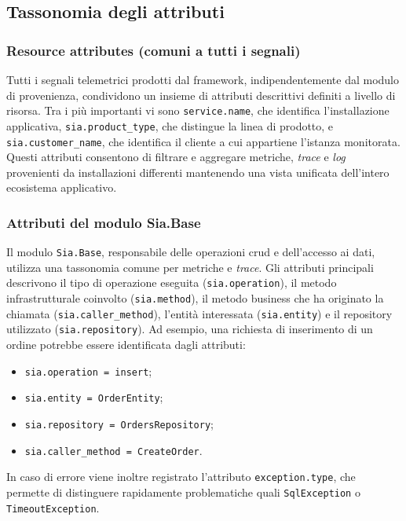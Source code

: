 \subsection{Tassonomia degli attributi}

\subsubsection{Resource attributes (comuni a tutti i segnali)}

Tutti i segnali telemetrici prodotti dal framework, indipendentemente dal modulo di provenienza, condividono un insieme di attributi descrittivi definiti a livello di risorsa. Tra i più importanti vi sono \texttt{service.name}, che identifica l'installazione applicativa, \texttt{sia.product\_type}, che distingue la linea di prodotto, e \texttt{sia.customer\_name}, che identifica il cliente a cui appartiene l'istanza monitorata.
Questi attributi consentono di filtrare e aggregare metriche, \emph{trace} e \emph{log} provenienti da installazioni differenti mantenendo una vista unificata dell'intero ecosistema applicativo.

\subsubsection{Attributi del modulo Sia.Base}

Il modulo \texttt{Sia.Base}, responsabile delle operazioni \gls{crud} e dell'accesso ai dati, utilizza una tassonomia comune per metriche e \emph{trace}. Gli attributi principali descrivono il tipo di operazione eseguita (\texttt{sia.operation}), il metodo infrastrutturale coinvolto (\texttt{sia.method}), il metodo business che ha originato la chiamata (\texttt{sia.caller\_method}), l'entità interessata (\texttt{sia.entity}) e il repository utilizzato (\texttt{sia.repository}).
Ad esempio, una richiesta di inserimento di un ordine potrebbe essere identificata dagli attributi:

\begin{itemize}
      \item \texttt{sia.operation = insert};
      \item \texttt{sia.entity = OrderEntity};
      \item \texttt{sia.repository = OrdersRepository};
      \item \texttt{sia.caller\_method = CreateOrder}.
\end{itemize}
In caso di errore viene inoltre registrato l'attributo \texttt{exception.type}, che permette di distinguere rapidamente problematiche quali \texttt{SqlException} o \texttt{TimeoutException}.

